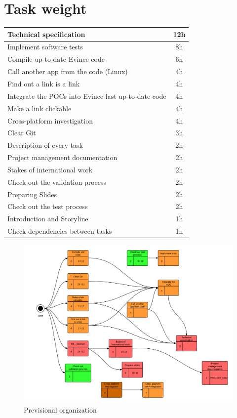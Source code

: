 \documentclass{article}%
\begin{document}
\section{Task weight}

\begin{tabular}{|l|c|}
\hline
Technical specification & 12h \\ \hline
Implement software tests & 8h \\ \hline
Compile up-to-date Evince code & 6h \\ \hline
Call another app from the code (Linux) & 4h \\ \hline
Find out a link is a link & 4h \\ \hline
Integrate the POCs into Evince last up-to-date code & 4h \\ \hline
Make a link clickable & 4h \\ \hline
Cross-platform investigation & 4h \\ \hline
Clear Git & 3h \\ \hline
Description of every task & 2h \\ \hline
Project management documentation & 2h \\ \hline
Stakes of international work & 2h \\ \hline
Check out the validation process & 2h \\ \hline
Preparing Slides & 2h \\ \hline
Check out the test process & 2h \\ \hline
Introduction and Storyline & 1h \\ \hline
Check dependencies between tasks & 1h \\ \hline
\end{tabular}

\begin{figure}[ht]
    \centering
    \includegraphics[width=0.5\paperheight]{gantt}
    \caption{Previsional organization}
    \label{fig:gantt}
\end{figure}
\end{document}
